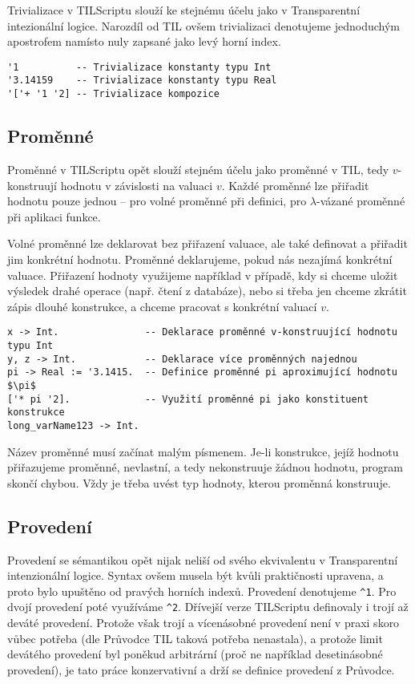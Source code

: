 Trivializace v TILScriptu slouží ke stejnému účelu jako v Transparentní intezionální logice.
Narozdíl od TIL ovšem trivializaci denotujeme jednoduchým apostrofem namísto nuly zapsané jako
levý horní index.

\begin{lstlisting}[caption={Příklad trivializace.}]
'1          -- Trivializace konstanty typu Int
'3.14159    -- Trivializace konstanty typu Real
'['+ '1 '2] -- Trivializace kompozice
\end{lstlisting}

\subsection{Proměnné}

Proměnné v TILScriptu opět slouží stejném účelu jako proměnné v TIL, tedy $v$-konstruují hodnotu
v závislosti na valuaci $v$. Každé proměnné lze přiřadit hodnotu pouze jednou -- pro volné proměnné
při definici, pro $\lambda$-vázané proměnné při aplikaci funkce.

Volné proměnné lze deklarovat bez přiřazení valuace, ale také definovat a přiřadit jim konkrétní
hodnotu. Proměnné deklarujeme, pokud nás nezajímá konkrétní valuace. Přiřazení hodnoty využijeme
například v případě, kdy si chceme uložit výsledek drahé operace (např. čtení z databáze), nebo
si třeba jen chceme zkrátit zápis dlouhé konstrukce, a chceme pracovat s konkrétní valuací $v$.

\begin{lstlisting}[caption={Příklad využití proměnných}]
x -> Int.               -- Deklarace proměnné v-konstruující hodnotu typu Int
y, z -> Int.            -- Deklarace více proměnných najednou
pi -> Real := '3.1415.  -- Definice proměnné pi aproximující hodnotu $\pi$
['* pi '2].             -- Využití proměnné pi jako konstituent konstrukce
long_varName123 -> Int.
\end{lstlisting}

Název proměnné musí začínat malým písmenem. Je-li konstrukce, jejíž hodnotu přiřazujeme proměnné,
nevlastní, a tedy nekonstruuje žádnou hodnotu, program skončí chybou. Vždy je třeba uvést typ
hodnoty, kterou proměnná konstruuje.

\subsection{Provedení}

Provedení se sémantikou opět nijak neliší od svého ekvivalentu v Transparentní intenzionální logice.
Syntax ovšem musela být kvůli praktičnosti upravena, a proto bylo upuštěno od pravých horních
indexů. Provedení denotujeme \lstinline{^1}. Pro dvojí provedení poté využíváme \lstinline{^2}.
Dřívejší verze TILScriptu definovaly i trojí až deváté provedení. Protože však trojí a vícenásobné
provedení není v praxi skoro vůbec potřeba (dle Průvodce TIL taková potřeba nenastala), a protože
limit devátého provedení byl poněkud arbitrární (proč ne například desetinásobné provedení), je
tato práce konzervativní a drží se definice provedení z Průvodce.

